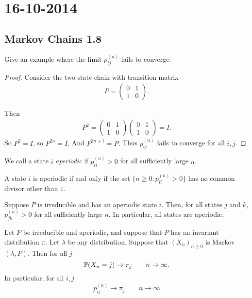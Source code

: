 \section{16-10-2014}
\subsection{Markov Chains 1.8}

\begin{prop}
Give an example where the limit \(p_{ij}^{(n)}\) fails to converge.
\end{prop}
\begin{proof}
Consider the two-state chain with transition matrix
\begin{gather*}
P=\begin{pmatrix}0&1\\ 1&0\end{pmatrix}.
\end{gather*}

Then \begin{gather*}
P^2=\begin{pmatrix}0&1\\ 1&0\end{pmatrix}\begin{pmatrix}0&1\\ 1&0\end{pmatrix}=I.
\end{gather*}
So \(P^2=I\), so \(P^{2n}=I.\) And \(P^{2n+1}=P.\) Thus \(p_{ij}^{(n)}\) fails to converge for all \(i,j\).
\end{proof}

\begin{defn}
We call a state \(i\) \emph{aperiodic} if \(p_{ii}^{(n)}>0\) for all sufficiently large \(n\).
\end{defn}

\begin{thm}
A state \(i\) is aperiodic if and only if the set
\(\{n\geq 0: p_{ii}^{(n)}>0\}\) has no common divisor other than \(1.\)
\end{thm}

\begin{thm}[Lemma 1.8.2]
Suppose \(P\) is irreducible and has an aperiodic state \(i\). Then, for all states \(j\) and \(k\), \(p_{jk}^{(n)}>0\) for all sufficiently large \(n\). In particular, all states are aperiodic.
\end{thm}

\begin{thm}[Theorem 1.8.3]
Let \(P\) be irreducible and aperiodic, and suppose that \(P\) has an invariant distribution \(\pi \). Let \(\lambda \) be any distribution. Suppose that
\((X_{n})_{n\geq 0}\) is Markov\((\lambda ,P)\). Then for all \(j\)
\[
\Bbb{P}(X_{n}=j)\rightarrow \pi _{j} \qquad n\rightarrow \infty .
\]
In particular, for all \(i,j\)
\[
p_{ij}^{(n)}\rightarrow \pi _{j} \qquad n\rightarrow \infty 
\]
\end{thm}

